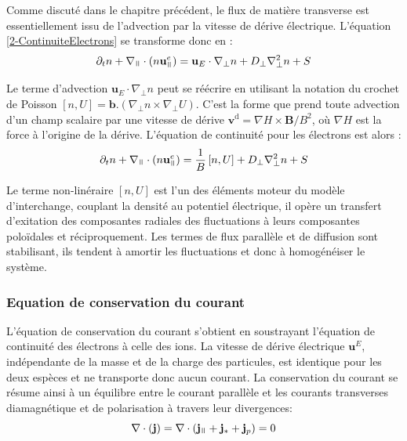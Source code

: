 \begin{refsection}
Comme discuté dans le chapitre précédent, le flux de matière transverse est
essentiellement issu de l'advection par la vitesse de
dérive électrique. L'équation \ref{2-ContinuiteElectrons} se transforme donc en :
\begin{equation}
\label{2-ContinuiteElectrons2}
\partial_t n + \nabla_\para\cdot(n\mathbf{u}^e_{\para}) =
\mathbf{u}_E\cdot\nabla_\perp n + D_\perp\nabla^2_\perp n + S
\end{equation}

Le terme d'advection $\mathbf{u}_E\cdot\nabla_\perp
n$ peut se réécrire en utilisant la notation
du crochet de Poisson $[n,U]=\mathbf{b}.(\nabla_\perp n\times\nabla_\perp U)$.
C'est la forme que prend toute advection d'un champ scalaire par une vitesse de
dérive $\mathbf{v}^\text{d}=\nabla H\times\mathbf{B}/B^2$, où $\nabla H$ est la
force à l'origine de la dérive. L'équation de continuité pour les électrons est
alors :
\begin{equation}
\partial_t n + \nabla_{\para}\cdot(n\mathbf{u}^e_{\para}) =
\frac{1}{B}\left[n,U\right] + D_\perp\nabla^2_\perp n + S
\end{equation}

Le terme non-linéraire $[n,U]$ est l'un des éléments moteur du modèle
d'interchange, couplant la densité au potentiel électrique, il opère un
transfert d'exitation des composantes radiales des fluctuations à leurs
composantes poloïdales et réciproquement. Les termes de flux parallèle et de
diffusion sont stabilisant, ils tendent à
amortir les fluctuations et donc à homogénéiser le système.

\subsubsection{Equation de conservation du courant}
L'équation de conservation du courant s'obtient en soustrayant l'équation de
continuité des électrons à celle des ions. La vitesse de dérive électrique
$\mathbf{u}^E$, indépendante de la masse et de la charge des particules, est
identique pour les deux espèces et ne transporte donc aucun courant. 
La conservation du courant se résume ainsi à un équilibre entre le courant
parallèle et les courants transverses diamagnétique et de polarisation à
travers leur divergences:
\begin{equation}
\label{EqCourant1}
\nabla\cdot\left(\mathbf{j}\right) = 
\nabla\cdot\left(\mathbf{j}_\para+\mathbf{j}_*+\mathbf{j}_p\right)
= 0
\end{equation}


\end{refsection}
